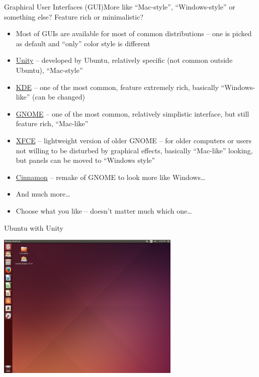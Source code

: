 \documentclass[compress, ucs, xelatex, 11pt, xcolor=svgnames,
  hyperref={
    bookmarks=true,
    unicode=true,
    colorlinks=true,
    pdftitle={Linux, command line and MetaCentrum},
    plainpages=false,
    pdfauthor={Vojtech Zeisek},
    pdfsubject={Course about use of Linux command line, writing shell scripts and using MetaCentrum of CESNET},
    pdfcreator={XeLaTeX},
    pdfkeywords={Linux, GNU, BASH, shell, command line, MetaCentrum},
    linkcolor=DarkRed,
    anchorcolor=DarkBlue,
    citecolor=Indigo,
    filecolor=NavyBlue,
    menucolor=DarkMagenta,
    urlcolor=DarkBlue,
    pdftex},
  url={hyphens, lowtilde} %
  ]{beamer}
\begin{document}
\begin{frame}{Graphical User Interfaces (GUI)}{More like ``Mac-style'', ``Windows-style'' or something else? Feature rich or minimalistic?}
  \begin{itemize}
    \item Most of GUIs are available for most of common distributions -- one is picked as default and ``only'' color style is different
    \item \href{https://unity.ubuntu.com/}{Unity} -- developed by Ubuntu, relatively specific (not common outside Ubuntu), ``Mac-style''
    \item \href{https://www.kde.org/}{KDE} -- one of the most common, feature extremely rich, basically ``Windows-like'' (can be changed)
    \item \href{https://www.gnome.org/}{GNOME} -- one of the most common, relatively simplistic interface, but still feature rich, ``Mac-like''
    \item \href{http://xfce.org/}{XFCE} -- lightweight version of older GNOME -- for older computers or users not willing to be disturbed by graphical effects, basically ``Mac-like'' looking, but panels can be moved to ``Windows style''
    \item \href{http://cinnamon.linuxmint.com/}{Cinnamon} -- remake of GNOME to look more like Windows\ldots
    \item And much more\ldots
    \item Choose what you like -- doesn't matter much which one\ldots
  \end{itemize}
\end{frame}

\begin{frame}{Ubuntu with Unity}
  \begin{center}
    \includegraphics[height=7cm]{ubuntu.png}
  \end{center}
\end{frame}
\end{document}
